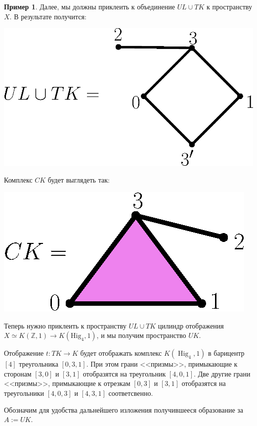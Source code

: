 \documentclass[14pt, dvipsnames]{extarticle}
\theoremstyle{definition}
\newtheorem{example}{Пример}
\theoremstyle{remark}
\DeclareMathOperator{\Hig}{\mathrm{Hig}}
\begin{document}
\begin{example}
Далее, мы должны приклеить к объединение $UL\cup TK$ к пространству $X$. В результате получится: 


\begin{center}
\includegraphics[scale=0.5]{pict3}
\end{center}

Комплекс $CK$ будет выглядеть так:

\begin{center}
\includegraphics[scale=0.8]{pict8}
\end{center}


Теперь нужно приклеить к пространству $UL\cup TK$ цилиндр отображения $X\simeq K(\mathbb{Z}, 1)\to K(\mathrm{Hig}_4, 1)$, и мы получим пространство $UK$. 

Отображение $t: TK\to K$ будет отображать комплекс $K(\Hig_4, 1)$ в барицентр $[4]$ треугольника $[0, 3, 1]$. При этом грани <<призмы>>, примыкающие к сторонам $[3, 0]$ и $[3, 1]$ отобразятся на треугольник $[4, 0, 1]$. Две другие грани <<призмы>>, примыкающие к отрезкам $[0, 3]$ и $[3, 1]$ отобразятся на треугольники $[4, 0, 3]$ и $[4, 3, 1]$ соответсвенно.  

Обозначим для удобства дальнейшего изложения получившееся образование за $A:=UK$. 



\end{example}
\end{document}
